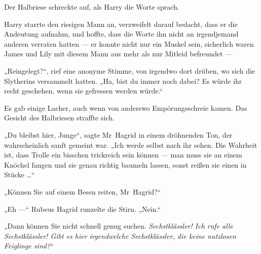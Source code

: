 Der Halbriese schreckte auf, als Harry die Worte sprach.

Harry starrte den riesigen Mann an, verzweifelt darauf bedacht, dass er die Andeutung aufnahm, und hoffte, dass die Worte ihn nicht an irgendjemand anderen verraten hatten — er konnte nicht nur ein Muskel sein, sicherlich waren James und Lily mit diesem Mann aus mehr als nur Mitleid befreundet —

„Reingelegt?“, rief eine anonyme Stimme, von irgendwo dort drüben, wo sich die Slytherins versammelt hatten.
„Ha, bist du immer noch dabei? Es würde ihr recht geschehen, wenn sie gefressen werden würde.“

Es gab einige Lacher, auch wenn von anderswo Empörungsschreie kamen. Das Gesicht des Halbriesen straffte sich.

„Du bleibst hier, Junge“, sagte Mr~Hagrid in einem dröhnenden Ton, der wahrscheinlich sanft gemeint war.
„Ich werde selbst nach ihr sehen. Die Wahrheit ist, dass Trolle ein bisschen trickreich sein können — man muss sie an einem Knöchel fangen und sie genau richtig baumeln lassen, sonst reißen sie einen in Stücke …“

„Können Sie auf einem Besen reiten, Mr~Hagrid?“

„Eh —“ Rubeus Hagrid runzelte die Stirn.
„Nein.“

„Dann können Sie nicht schnell genug suchen. \emph{Sechstklässler! Ich rufe alle Sechstklässler! Gibt es hier irgendwelche Sechstklässler, die keine nutzlosen Feiglinge sind?}“

